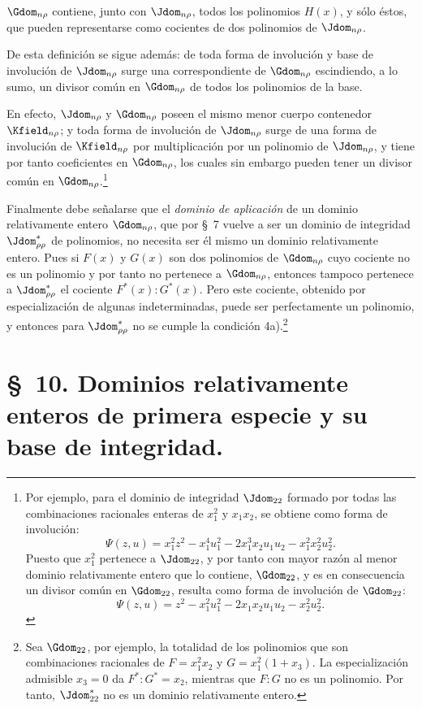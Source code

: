 \documentclass[11pt]{article}
\begin{document}
$\Gdom_{n\rho}$ contiene, junto con $\Jdom_{n\rho}$, todos los polinomios $H(x)$, y sólo éstos, que pueden representarse como cocientes de dos polinomios de $\Jdom_{n\rho}$.

De esta definición se sigue además: de toda forma de involución y base de involución de $\Jdom_{n\rho}$ surge una correspondiente de $\Gdom_{n\rho}$ escindiendo, a lo sumo, un divisor común en $\Gdom_{n\rho}$ de todos los polinomios de la base.

En efecto, $\Jdom_{n\rho}$ y $\Gdom_{n\rho}$ poseen el mismo menor cuerpo contenedor $\Kfield_{n\rho}$; y toda forma de involución de $\Jdom_{n\rho}$ surge de una forma de involución de $\Kfield_{n\rho}$ por multiplicación por un polinomio de $\Jdom_{n\rho}$, y tiene por tanto coeficientes en $\Gdom_{n\rho}$, los cuales sin embargo pueden tener un divisor común en $\Gdom_{n\rho}$.\footnote{Por ejemplo, para el dominio de integridad $\Jdom_{22}$ formado por todas las combinaciones racionales enteras de $x_1^2$ y $x_1x_2$, se obtiene como forma de involución:
\[
\Psi(z,u)=x_1^2z^2-x_1^4u_1^2-2x_1^3x_2u_1u_2-x_1^2x_2^2u_2^2.
\]
Puesto que $x_1^2$ pertenece a $\Jdom_{22}$, y por tanto con mayor razón al menor dominio relativamente entero que lo contiene, $\Gdom_{22}$, y es en consecuencia un divisor común en $\Gdom_{22}$, resulta como forma de involución de $\Gdom_{22}$:
\[
\Psi(z,u)=z^2-x_1^2u_1^2-2x_1x_2u_1u_2-x_2^2u_2^2.
\]}

Finalmente debe señalarse que el \emph{dominio de aplicación} de un dominio relativamente entero $\Gdom_{n\rho}$, que por \S\ 7 vuelve a ser un dominio de integridad $\Jdom^*_{\rho\rho}$ de polinomios, no necesita ser él mismo un dominio relativamente entero. Pues si $F(x)$ y $G(x)$ son dos polinomios de $\Gdom_{n\rho}$ cuyo cociente no es un polinomio y por tanto no pertenece a $\Gdom_{n\rho}$, entonces tampoco pertenece a $\Jdom^*_{\rho\rho}$ el cociente $F^*(x):G^*(x)$. Pero este cociente, obtenido por especialización de algunas indeterminadas, puede ser perfectamente un polinomio, y entonces para $\Jdom^*_{\rho\rho}$ no se cumple la condición 4a).\footnote{Sea $\Gdom_{22}$, por ejemplo, la totalidad de los polinomios que son combinaciones racionales de $F=x_1^2x_2$ y $G=x_1^2(1+x_3)$. La especialización admisible $x_3=0$ da $F^*:G^*=x_2$, mientras que $F:G$ no es un polinomio. Por tanto, $\Jdom^*_{22}$ no es un dominio relativamente entero.}

\section*{\S\ 10. Dominios relativamente enteros de primera especie y su base de integridad.}
\end{document}
